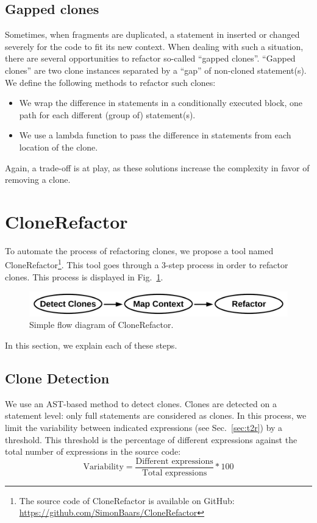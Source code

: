 \documentclass[sigconf,review]{acmart}
\begin{document}
\subsection{Gapped clones} \label{sec:t3r}
Sometimes, when fragments are duplicated, a statement in inserted or changed severely for the code to fit its new context. When dealing with such a situation, there are several opportunities to refactor so-called ``gapped clones''. ``Gapped clones'' are two clone instances separated by a ``gap'' of non-cloned statement(s). We define the following methods to refactor such clones:
\begin{itemize}
  \item We wrap the difference in statements in a conditionally executed block, one path for each different (group of) statement(s).
  \item We use a lambda function to pass the difference in statements from each location of the clone.
\end{itemize}
Again, a trade-off is at play, as these solutions increase the complexity in favor of removing a clone.

\section{CloneRefactor}
To automate the process of refactoring clones, we propose a tool named CloneRefactor\footnote{The source code of CloneRefactor is available on GitHub: \url{https://github.com/SimonBaars/CloneRefactor}}. This tool goes through a 3-step process in order to refactor clones. This process is displayed in Fig.~\ref{fig:clonerefactorflow}.
\begin{figure}[H]
  \includegraphics[width=1\columnwidth]{img/flow}
  \caption{Simple flow diagram of CloneRefactor.}
  \label{fig:clonerefactorflow}
\end{figure}
In this section, we explain each of these steps.

\subsection{Clone Detection}
We use an AST-based method to detect clones. Clones are detected on a statement level: only full statements are considered as clones. In this process, we limit the variability between indicated expressions (see Sec.~\ref{sec:t2r}) by a threshold. This threshold is the percentage of different expressions against the total number of expressions in the source code:
\begin{equation}\label{eq:type2r}
\text{Variability}=\frac{\text{Different expressions}}{\text{Total expressions}}*100
\end{equation}
\end{document}
